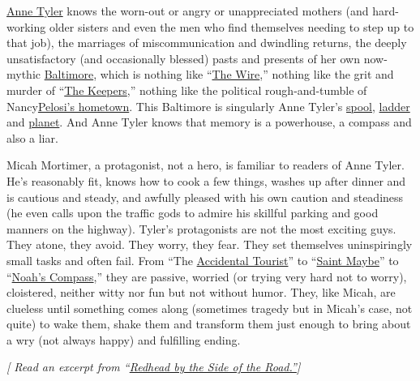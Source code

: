 \href{https://www.nytimes.com/2018/07/05/books/anne-tyler-clock-dance.html}{Anne
Tyler} knows the worn-out or angry or unappreciated mothers (and
hard-working older sisters and even the men who find themselves needing
to step up to that job), the marriages of miscommunication and dwindling
returns, the deeply unsatisfactory (and occasionally blessed) pasts and
presents of her own now-mythic
\href{https://www.nytimes.com/2019/03/22/t-magazine/baltimore-artists-art-culture.html}{Baltimore},
which is nothing like
``\href{https://www.nytimes.com/watching/recommendations/watching-tv-the-wire}{The
Wire},'' nothing like the grit and murder of
``\href{https://www.nytimes.com/2017/05/18/arts/television/review-the-keepers-netflix.html}{The
Keepers},'' nothing like the political rough-and-tumble of
Nancy\href{https://www.nytimes.com/2019/01/12/opinion/sunday/dowd-nancy-pelosi-donald-trump.html}{Pelosi's
hometown}. This Baltimore is singularly Anne Tyler's
\href{https://www.nytimes.com/2015/02/06/books/anne-tylers-20th-novel-a-spool-of-blue-thread.html}{spool},
\href{http://movies2.nytimes.com/books/98/04/19/specials/tyler-ladder.html}{ladder}
and
\href{https://archive.nytimes.com/www.nytimes.com/books/98/04/19/reviews/980419.19shieldt.html}{planet}.
And Anne Tyler knows that memory is a powerhouse, a compass and also a
liar.

Micah Mortimer, a protagonist, not a hero, is familiar to readers of
Anne Tyler. He's reasonably fit, knows how to cook a few things, washes
up after dinner and is cautious and steady, and awfully pleased with his
own caution and steadiness (he even calls upon the traffic gods to
admire his skillful parking and good manners on the highway). Tyler's
protagonists are not the most exciting guys. They atone, they avoid.
They worry, they fear. They set themselves uninspiringly small tasks and
often fail. From ``The
\href{https://www.nytimes.com/1985/09/08/books/the-accidental-tourist.html}{Accidental
Tourist}'' to
``\href{https://archive.nytimes.com/www.nytimes.com/books/98/04/19/specials/tyler-saint.html}{Saint
Maybe}'' to
``\href{https://www.nytimes.com/2010/01/03/books/review/Harrison-t.html}{Noah's
Compass},'' they are passive, worried (or trying very hard not to
worry), cloistered, neither witty nor fun but not without humor. They,
like Micah, are clueless until something comes along (sometimes tragedy
but in Micah's case, not quite) to wake them, shake them and transform
them just enough to bring about a wry (not always happy) and fulfilling
ending.

\emph{{[} Read an excerpt from
``}\href{https://www.nytimes.com/2020/04/07/books/review/redhead-by-the-side-of-the-road-by-anne-tyler-an-excerpt.html}{\emph{Redhead
by the Side of the Road.''}}\emph{{]}}

